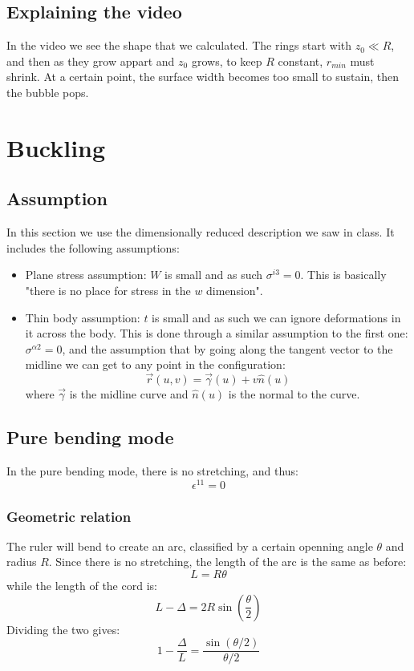 \documentclass{article}
\begin{document}
\subsection{Explaining the video}
In the video we see the shape that we calculated. The rings start with $z_0 \ll R$, and then as they grow appart and $z_0$ grows, to keep $R$ constant, $r_{min}$ must shrink.
At a certain point, the surface width becomes too small to sustain, then the bubble pops.

\section{Buckling}
\subsection{Assumption}
In this section we use the dimensionally reduced description we saw in class. It includes the following assumptions:
\begin{itemize}
    \item Plane stress assumption: $W$ is small and as such $\sigma^{i3} = 0$. This is basically "there is no place for stress in the $w$ dimension".
    \item Thin body assumption: $t$ is small and as such we can ignore deformations in it across the body. This is done through a similar assumption to the first one: $\sigma^{\alpha 2} = 0$, and the assumption that by going along the tangent vector to the midline we can get to any point in the configuration:
    \begin{equation}
        \vec{r}(u, v) = \vec{\gamma}(u) + v\hat{n}(u)
    \end{equation}
    where $\vec{\gamma}$ is the midline curve and $\hat{n}(u)$ is the normal to the curve.
\end{itemize}
\subsection{Pure bending mode}
In the pure bending mode, there is no stretching, and thus:
\begin{equation}
    \epsilon^{11} = 0
\end{equation}
\subsubsection{Geometric relation}
The ruler will bend to create an arc, classified by a certain openning angle $\theta$ and radius $R$. Since there is no stretching, the length of the arc is the same as before:
\begin{equation}
    L = R\theta
\end{equation}
while the length of the cord is:
\begin{equation}
    L - \Delta = 2R \sin(\frac{\theta}{2})
\end{equation}
Dividing the two gives:
\begin{equation}
    \boxed{1 - \frac{\Delta}{L} = \frac{\sin(\theta/2)}{\theta/2}}
\end{equation}
\end{document}

